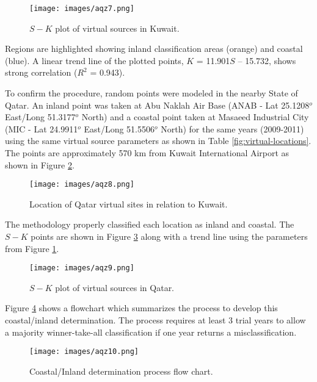 %
%
\begin{figure}[H]
\centering
\texttt{[image: images/aqz7.png]} 
\caption{$S-K$ plot of virtual sources in Kuwait.}
\label{fig:SKplotKuwait}
\end{figure}
%

Regions are highlighted showing inland classification areas (orange) and coastal (blue). A linear trend line of the plotted points, $K$ = 11.901$S$ – 15.732, shows strong correlation ($R^{2}$ = 0.943).

To confirm the procedure, random points were modeled in the nearby State of Qatar. An inland point was taken at Abu Naklah Air Base (ANAB - Lat 25.1208$^{o}$ East/Long 51.3177$^{o}$ North) and a coastal point taken at Masaeed Industrial City (MIC - Lat 24.9911$^{o}$ East/Long 51.5506$^{o}$ North) for the same years (2009-2011) using the same virtual source parameters as shown in Table \ref{fig:virtual-locations}. The points are approximately 570 km from Kuwait International Airport as shown in Figure \ref{fig:qatarlocs}. 

%
\begin{figure}[H]
\centering
\texttt{[image: images/aqz8.png]} 
\caption{Location of Qatar virtual sites in relation to Kuwait.}
\label{fig:qatarlocs}
\end{figure}
%

The methodology properly classified each location as inland and coastal.  The $S-K$ points are shown in Figure \ref{fig:SKplotQatar} along with a trend line using the parameters from Figure \ref{fig:SKplotKuwait}.

%
\begin{figure}[H]
\centering
\texttt{[image: images/aqz9.png]} 
\caption{$S-K$ plot of virtual sources in Qatar.}
\label{fig:SKplotQatar}
\end{figure}
%

Figure \ref{fig:flowchart} shows a flowchart which summarizes the process to develop this coastal/inland determination.  The process requires at least 3 trial years to allow a majority winner-take-all classification if one year returns a misclassification.

%
\begin{figure}[H]
\centering
\texttt{[image: images/aqz10.png]} 
\caption{Coastal/Inland determination process flow chart.}
\label{fig:flowchart}
\end{figure}
%

